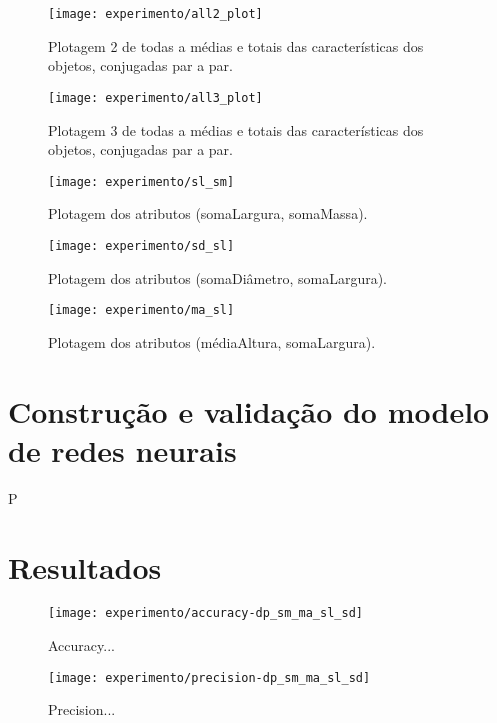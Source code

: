 \begin{figure}[!htb] \centering 
  \centering
  \texttt{[image: experimento/all2\_plot]} 
  \caption{Plotagem 2 de todas a médias e totais das características dos objetos, conjugadas par a par.} 
  \label{fig:plotall2}
\end{figure}

\begin{figure}[!htb] \centering 
  \centering
  \texttt{[image: experimento/all3\_plot]} 
  \caption{Plotagem 3 de todas a médias e totais das características dos objetos, conjugadas par a par.} 
  \label{fig:plotall3}
\end{figure}

\begin{figure}[!htb] \centering 
  \centering
  \texttt{[image: experimento/sl\_sm]} 
  \caption{Plotagem dos atributos (somaLargura, somaMassa). } 
  \label{fig:sl_sm}
\end{figure}

\begin{figure}[!htb] \centering 
  \centering
  \texttt{[image: experimento/sd\_sl]} 
  \caption{Plotagem dos atributos (somaDiâmetro, somaLargura). } 
  \label{fig:sd_sl}
\end{figure}

\begin{figure}[!htb] \centering 
  \centering
  \texttt{[image: experimento/ma\_sl]} 
  \caption{Plotagem dos atributos (médiaAltura, somaLargura). } 
  \label{fig:ma_sl}
\end{figure}

\section{Construção e validação do modelo de redes neurais}
P
\section{Resultados}

\begin{figure}[!htb] \centering 
  \centering
  \texttt{[image: experimento/accuracy-dp\_sm\_ma\_sl\_sd]} 
  \caption{Accuracy... } 
  \label{fig:accuracy_result}
\end{figure}

\begin{figure}[!htb] \centering 
  \centering
  \texttt{[image: experimento/precision-dp\_sm\_ma\_sl\_sd]} 
  \caption{Precision... } 
  \label{fig:precision_result}
\end{figure}

